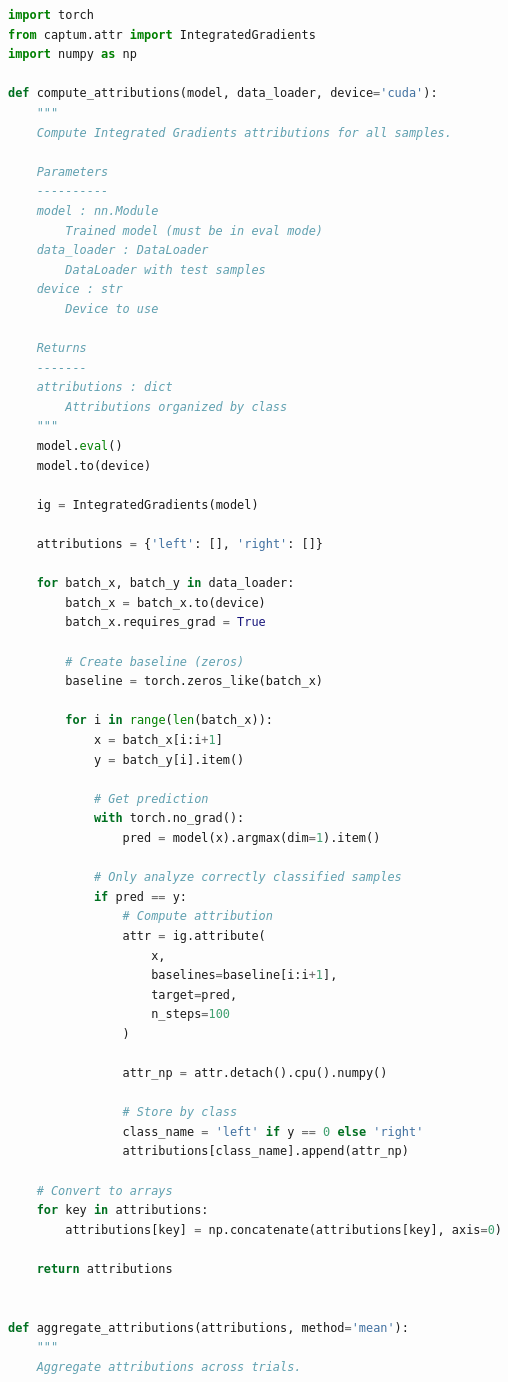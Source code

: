 \begin{lstlisting}[language=Python, caption={Integrated Gradients analysis}, label={lst:ig}]
import torch
from captum.attr import IntegratedGradients
import numpy as np

def compute_attributions(model, data_loader, device='cuda'):
    """
    Compute Integrated Gradients attributions for all samples.
    
    Parameters
    ----------
    model : nn.Module
        Trained model (must be in eval mode)
    data_loader : DataLoader
        DataLoader with test samples
    device : str
        Device to use
    
    Returns
    -------
    attributions : dict
        Attributions organized by class
    """
    model.eval()
    model.to(device)
    
    ig = IntegratedGradients(model)
    
    attributions = {'left': [], 'right': []}
    
    for batch_x, batch_y in data_loader:
        batch_x = batch_x.to(device)
        batch_x.requires_grad = True
        
        # Create baseline (zeros)
        baseline = torch.zeros_like(batch_x)
        
        for i in range(len(batch_x)):
            x = batch_x[i:i+1]
            y = batch_y[i].item()
            
            # Get prediction
            with torch.no_grad():
                pred = model(x).argmax(dim=1).item()
            
            # Only analyze correctly classified samples
            if pred == y:
                # Compute attribution
                attr = ig.attribute(
                    x,
                    baselines=baseline[i:i+1],
                    target=pred,
                    n_steps=100
                )
                
                attr_np = attr.detach().cpu().numpy()
                
                # Store by class
                class_name = 'left' if y == 0 else 'right'
                attributions[class_name].append(attr_np)
    
    # Convert to arrays
    for key in attributions:
        attributions[key] = np.concatenate(attributions[key], axis=0)
    
    return attributions


def aggregate_attributions(attributions, method='mean'):
    """
    Aggregate attributions across trials.
    

\end{lstlisting}
